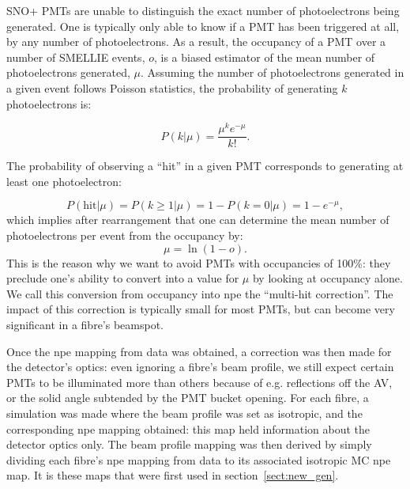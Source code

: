 SNO+ PMTs are unable to distinguish the exact number of photoelectrons being generated. One is typically only able to know if a PMT has been triggered at all, by any number of photoelectrons. As a result, the occupancy of a PMT over a number of SMELLIE events, $o$, is a biased estimator of the mean number of photoelectrons generated, $\mu$. Assuming the number of photoelectrons generated in a given event follows Poisson statistics, the probability of generating $k$ photoelectrons is:

\begin{equation}
    P\left(k | \mu\right) = \frac{\mu^{k}e^{-\mu}}{k!}.
\end{equation}

The probability of observing a ``hit'' in a given PMT corresponds to generating at least one photoelectron:

\begin{equation}\label{eq:p_hit}
    P\left(\text{hit}| \mu\right) = P\left(k\geq 1 | \mu\right) = 1 - P\left(k = 0 | \mu\right) = 1 - e^{-\mu},
\end{equation}
which implies after rearrangement that one can determine the mean number of photoelectrons per event from the occupancy by:
\begin{equation}\label{eq:multihit_correction}
    \mu = \ln\left(1 - o\right).
\end{equation}
This is the reason why we want to avoid PMTs with occupancies of 100\%: they preclude one's ability to convert into a value for $\mu$ by looking at occupancy alone. We call this conversion from occupancy into npe the ``multi-hit correction''. The impact of this correction is typically small for most PMTs, but can become very significant in a fibre's beamspot.

Once the npe mapping from data was obtained, a correction was then made for the detector's optics: even ignoring a fibre's beam profile, we still expect certain PMTs to be illuminated more than others because of e.g. reflections off the AV, or the solid angle subtended by the PMT bucket opening. For each fibre, a simulation was made where the beam profile was set as isotropic, and the corresponding npe mapping obtained: this map held information about the detector optics only. The beam profile mapping was then derived by simply dividing each fibre's npe mapping from data to its associated isotropic MC npe map. It is these maps that were first used in section~\ref{sect:new_gen}.

